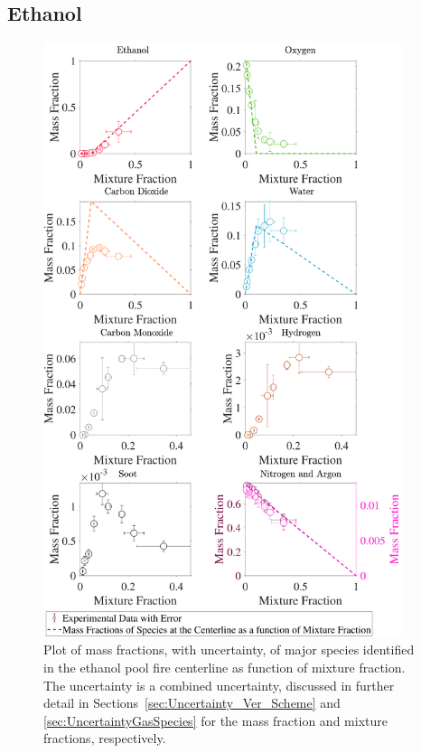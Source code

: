 \documentclass[12pt]{article}
\begin{document}
\subsection{Ethanol}
\label{ssec:Ethanol_ALL_Mix_Frac}
\begin{figure}[h!]
	\centering
\includegraphics[width=10.5cm,keepaspectratio]{Ethanol_Mixture_Fraction_Major_Plot.pdf}
	\caption[Species mass fractions superimposed on ethanol state relations]{Plot of mass fractions, with uncertainty, of major species identified in the ethanol pool fire centerline as function of mixture fraction. The uncertainty is a combined uncertainty, discussed in further detail in Sections~\ref{sec:Uncertainty_Ver_Scheme} and \ref{sec:UncertaintyGasSpecies} for the mass fraction and mixture fractions, respectively.}
	\label{fig:Ethanol_MIX_Frac_Major}
\end{figure}

\pagebreak
\end{document}
